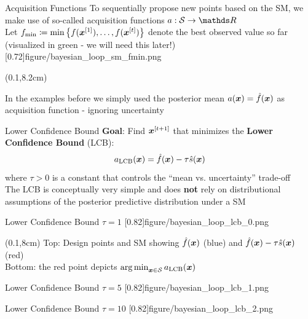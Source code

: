 \documentclass[11pt,compress,t,notes=noshow, xcolor=table]{beamer}
\begin{document}
\begin{framev}[align=top]{Acquisition Functions}
To sequentially propose new points based on the SM, we make use of so-called acquisition functions $a: \mathcal{S} \to \R$\\
\spacer
Let $f_{\min} \coloneqq \min \left\{f(\bm{x}^{[1]}), \ldots, f(\bm{x}^{[t]})\right\}$ denote the best observed value so far (visualized in green - we will need this later!)
\imageFixed{3.5cm}{3.5cm}[0.72]{figure/bayesian_loop_sm_fmin.png}
\begin{textblock*}{\linewidth}(0.1\linewidth,8.2cm)
\begin{footnotesize}
In the examples before we simply used the posterior mean $a(\bm{x}) = \hat{f}(\bm{x})$ as acquisition function - ignoring uncertainty
\end{footnotesize}
\end{textblock*}
\end{framev}


\begin{framev}{Lower Confidence Bound}
\textbf{Goal}: Find $\bm{x}^{[t+1]}$ that minimizes the \textbf{Lower Confidence Bound} (LCB):
$$
a_{\text{LCB}}(\bm{x}) = \hat{f}(\bm{x}) - \tau \hat{s}(\bm{x})
$$
where $\tau > 0$ is a constant that controls the \enquote{mean vs. uncertainty} trade-off\\
\vfill
The LCB is conceptually very simple and does \textbf{not} rely on distributional assumptions of the posterior predictive distribution under a SM
\end{framev}


\begin{framev}[align=top]{Lower Confidence Bound}
$\tau = 1$
\imageFixed{2.5cm}{1.5cm}[0.82]{figure/bayesian_loop_lcb_0.png}
\begin{textblock*}{\linewidth}(0.1\linewidth,8cm)
Top: Design points and SM showing $\hat{f}(\bm{x})$ (blue) and $\hat{f}(\bm{x}) - \tau \hat{s}(\bm{x})$ (red)\\
Bottom: the red point depicts $\mathop{\mathrm{arg\,min}}_{\bm{x} \in \mathcal{S}} a_{\text{LCB}}(\bm{x})$
\end{textblock*}
\end{framev}


\begin{framev}[align=top]{Lower Confidence Bound}
$\tau = 5$
\imageFixed{2.5cm}{1.5cm}[0.82]{figure/bayesian_loop_lcb_1.png}
\end{framev}


\begin{framev}[align=top]{Lower Confidence Bound}
$\tau = 10$
\imageFixed{2.5cm}{1.5cm}[0.82]{figure/bayesian_loop_lcb_2.png}
\end{framev}

\endlecture
\end{document}
